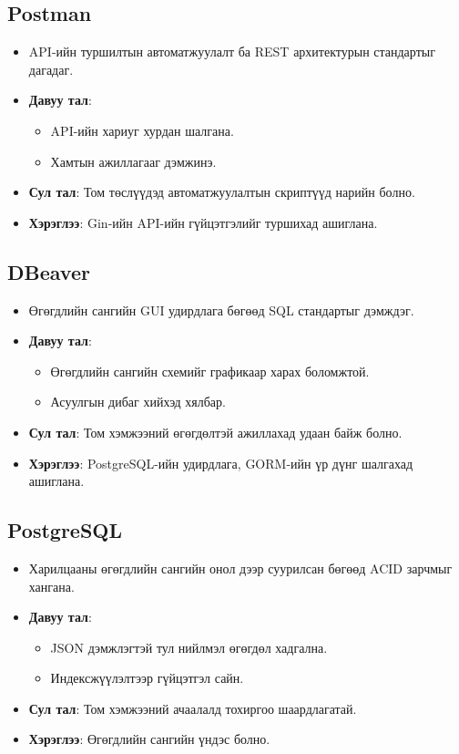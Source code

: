 \subsection{Postman}
\begin{itemize}
    \item API-ийн туршилтын автоматжуулалт ба REST архитектурын стандартыг дагадаг.
    \item \textbf{Давуу тал}: 
    \begin{itemize}
        \item API-ийн хариуг хурдан шалгана.
        \item Хамтын ажиллагааг дэмжинэ.
    \end{itemize}
    \item \textbf{Сул тал}: Том төслүүдэд автоматжуулалтын скриптүүд нарийн болно.
    \item \textbf{Хэрэглээ}: Gin-ийн API-ийн гүйцэтгэлийг туршихад ашиглана.
\end{itemize}

\subsection{DBeaver}
\begin{itemize}
    \item Өгөгдлийн сангийн GUI удирдлага бөгөөд SQL стандартыг дэмждэг.
    \item \textbf{Давуу тал}: 
    \begin{itemize}
        \item Өгөгдлийн сангийн схемийг графикаар харах боломжтой.
        \item Асуулгын дибаг хийхэд хялбар.
    \end{itemize}
    \item \textbf{Сул тал}: Том хэмжээний өгөгдөлтэй ажиллахад удаан байж болно.
    \item \textbf{Хэрэглээ}: PostgreSQL-ийн удирдлага, GORM-ийн үр дүнг шалгахад ашиглана.
\end{itemize}

\subsection{PostgreSQL}
\begin{itemize}
    \item Харилцааны өгөгдлийн сангийн онол дээр суурилсан бөгөөд ACID зарчмыг хангана.
    \item \textbf{Давуу тал}: 
    \begin{itemize}
        \item JSON дэмжлэгтэй тул нийлмэл өгөгдөл хадгална.
        \item Индексжүүлэлтээр гүйцэтгэл сайн.
    \end{itemize}
    \item \textbf{Сул тал}: Том хэмжээний ачаалалд тохиргоо шаардлагатай.
    \item \textbf{Хэрэглээ}: Өгөгдлийн сангийн үндэс болно.
\end{itemize}


